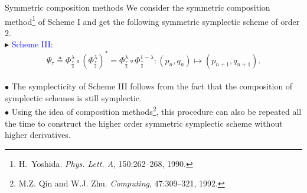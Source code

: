 \documentclass[10pt]{beamer}
\begin{document}
\begin{frame}{Symmetric composition methods}
We consider the symmetric composition method\footnote{H.~Yoshida. {\em Phys. Lett. A}, 150:262--268, 1990.} of Scheme I and get the following symmetric symplectic scheme of order $2$.\\
\vspace{3mm}
\textcolor[rgb]{0,0,1}{$\blacktriangleright$} \textcolor{blue}{Scheme III:}
\begin{equation}\label{eq-19}
\Psi_\tau\triangleq \Phi_{\frac{\tau}{2}}^{\lambda} \circ (\Phi_{\frac{\tau}{2}}^{\lambda})^*=\Phi_{\frac{\tau}{2}}^{\lambda} \circ \Phi_{\frac{\tau}{2}}^{1-\lambda}: (p_n,q_n) \mapsto (p_{n+1},q_{n+1}).
\end{equation}\\
\vspace{3mm}
\quad\textcolor[rgb]{0,0,1}{$\bullet$} The symplecticity of Scheme III follows from the fact that the composition of symplectic schemes is still symplectic.\\ 
\vspace{3mm}
\quad\textcolor[rgb]{0,0,1}{$\bullet$} Using the idea of composition methods\footnote{M.Z. Qin and W.J. Zhu. {\em Computing}, 47:309--321, 1992.}, this procedure can also be repeated all the time to construct the higher order symmetric symplectic scheme without higher derivatives.
\end{frame}
\end{document}

